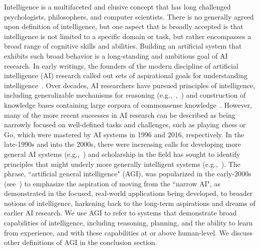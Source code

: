     Intelligence is a multifaceted and elusive concept that has long challenged psychologists, philosophers, and computer scientists. There is no generally agreed upon definition of intelligence, but one aspect that is broadly accepted is that intelligence is not limited to a specific domain or task, but rather encompasses a broad range of cognitive skills and abilities. Building an artificial system that exhibits such broad behavior is a long-standing and ambitious goal of AI research. In early writings, the founders of the modern discipline of artificial intelligence (AI) research called out sets of aspirational goals for understanding intelligence~\cite{mccarthy2006proposal}. Over decades, AI researchers have pursued principles of intelligence, including generalizable mechanisms for reasoning (e.g.,~\cite{newellshawsimonGPS1959},~\cite{lindsay1993dendral}) and construction of knowledge bases containing large corpora of commonsense knowledge~\cite{lenat1995cyc}. However, many of the more recent successes in AI research can be described as being narrowly focused on well-defined tasks and challenges, such as playing chess or Go, which were mastered by AI systems in 1996 and 2016, respectively. In the late-1990s and into the 2000s, there were increasing calls for developing more general AI systems (e.g.,~\cite{selman1996challenge}) and scholarship in the field has sought to identify principles that might underly more generally intelligent systems (e.g.,~\cite{legg2008machine, gershman2015computational}). The phrase, ``artificial general intelligence" (AGI), was popularized in the early-2000s (see~\cite{goertzel2014artificial}) to emphasize the aspiration of moving from the ``narrow AI", as demonstrated in the focused, real-world applications being developed, to broader notions of intelligence, harkening back to the long-term aspirations and dreams of earlier AI research. We use AGI to refer to systems that demonstrate broad capabilities of intelligence, including reasoning, planning, and the ability to learn from experience, and with these capabilities at or above human-level. We discuss other definitions of AGI in the conclusion section.

